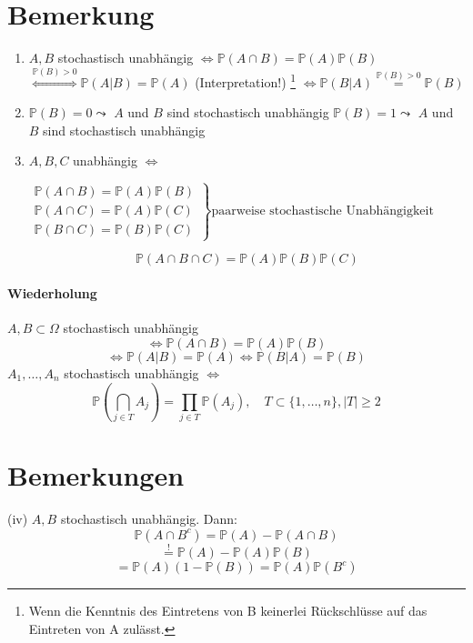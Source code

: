 \documentclass[a4paper,11pt,notitlepage]{report}
\newcommand{\Prim}{{\ensuremath{\mathbb{P}}}}
\begin{document}
\section{Bemerkung}
\begin{enumerate}
	\item $A,B$ stochastisch unabhängig \newline
	$\Leftrightarrow \Prim(A \cap B) = \Prim(A)\Prim(B)$ \newline
	$\overset{\Prim(B)>0}{\Leftrightarrow} \Prim(A|B) = \Prim(A)$ (Interpretation!)
	\footnote{Wenn die Kenntnis des Eintretens von B keinerlei Rückschlüsse auf das Eintreten von A zulässt.} \newline
	$\Leftrightarrow \Prim(B|A) \overset{\Prim(B)>0}{=} \Prim(B)$
	
	\item $\Prim(B) = 0 \leadsto$ $A$ und $B$ sind stochastisch unabhängig \newline
		$\Prim(B) = 1 \leadsto$ $A$ und $B$ sind stochastisch unabhängig
		
	\item $A,B,C$ unabhängig $\Leftrightarrow$
		
		$\left.
\begin{array}{cc} %
\Prim(A \cap B) = \Prim(A)\Prim(B)
 \\ \Prim(A \cap C) = \Prim(A)\Prim(C) 
 \\ \Prim(B \cap C) = \Prim(B)\Prim(C) 
\end{array}
\right\}
\text{paarweise stochastische Unabhängigkeit}
$
		
		$$\Prim(A \cap B \cap C) = \Prim(A) \Prim(B) \Prim(C)$$
\end{enumerate}

\paragraph{Wiederholung}
$A,B \subset \Omega$ stochastisch unabhängig $$\Leftrightarrow \Prim(A \cap B)=\Prim(A) \Prim(B)$$
$$\Leftrightarrow \Prim(A|B)=\Prim(A) \Leftrightarrow \Prim(B|A)=\Prim(B)$$
$A_1, \ldots, A_n$ stochastisch unabhängig $\Leftrightarrow$
$$\Prim(\bigcap\limits_{j \in T}{A_j}) = \prod\limits_{j \in T}{\Prim(A_j)}, \quad T \subset \{1, \ldots, n\}, |T| \geq 2$$

\section{Bemerkungen}
(iv) $A,B$ stochastisch unabhängig. Dann:
$$\Prim(A \cap B^c) = \Prim(A) - \Prim(A \cap B)$$
$$\overset{!}{=} \Prim(A) - \Prim(A) \Prim(B)$$
$$=\Prim(A)(1-\Prim(B)) = \Prim(A)\Prim(B^c)$$
\end{document}

